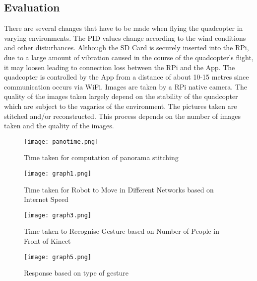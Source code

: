 \subsection{Evaluation}
There are several changes that have to be made when flying the quadcopter in varying environments. The PID values change according to the wind conditions and other disturbances. Although the SD Card is securely inserted into the RPi, due to a large amount of vibration caused in the course of the quadcopter's flight, it may loosen leading to connection loss between the RPi and the App. The quadcopter is controlled by the App from a distance of about 10-15 metres since communication occurs via WiFi. Images are taken by a RPi native camera. The quality of the images taken largely depend on the stability of the quadcopter which are subject to the vagaries of the environment.
The pictures taken are stitched and/or reconstructed. This process depends on the number of images taken and the quality of the images. 
\begin{figure}[H]
  \centering
  \texttt{[image: panotime.png]}
  \caption{Time taken for computation of panorama stitching}
  \label{Internet speed based performance}	
\end{figure}


\begin{figure}[H]
  \centering
  \texttt{[image: graph1.png]}
  \caption{Time taken for Robot to Move in Different Networks based on Internet Speed}
  \label{Network based performance}	
\end{figure}

\begin{figure}[H]
  \centering
  \texttt{[image: graph3.png]}
  \caption{Time taken to Recognise Gesture based on Number of People in Front of Kinect}
  \label{Kinect performance}	
\end{figure}


\begin{figure}[H]
  \centering
  \texttt{[image: graph5.png]}
  \caption{Response based on type of gesture}
  \label{Gesture-action pair}	
\end{figure}


